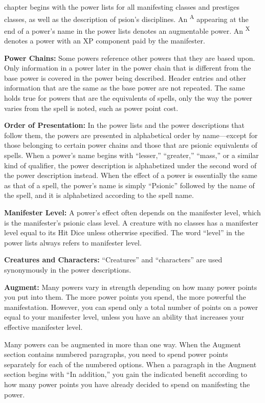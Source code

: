 {}{}

 chapter begins with the power lists for all manifesting classes and prestiges classes, as well as the description of psion's disciplines. An \textsuperscript{A} appearing at the end of a power's name in the power lists denotes an augmentable power. An \textsuperscript{X} denotes a power with an XP component paid by the manifester.

\textbf{Power Chains:} Some powers reference other powers that they are based upon. Only information in a power later in the power chain that is different from the base power is covered in the power being described. Header entries and other information that are the same as the base power are not repeated. The same holds true for powers that are the equivalents of spells, only the way the power varies from the spell is noted, such as power point cost.

\textbf{Order of Presentation:} In the power lists and the power descriptions that follow them, the powers are presented in alphabetical order by name---except for those belonging to certain power chains and those that are psionic equivalents of spells. When a power's name begins with ``lesser,'' ``greater,'' ``mass,'' or a similar kind of qualifier, the power description is alphabetized under the second word of the power description instead. When the effect of a power is essentially the same as that of a spell, the power's name is simply ``Psionic'' followed by the name of the spell, and it is alphabetized according to the spell name.

\textbf{Manifester Level:} A power's effect often depends on the manifester level, which is the manifester's psionic class level. A creature with no classes has a manifester level equal to its Hit Dice unless otherwise specified. The word ``level'' in the power lists always refers to manifester level.

\textbf{Creatures and Characters:} ``Creatures'' and ``characters'' are used synonymously in the power descriptions.

\textbf{Augment:} Many powers vary in strength depending on how many power points you put into them. The more power points you spend, the more powerful the manifestation. However, you can spend only a total number of points on a power equal to your manifester level, unless you have an ability that increases your effective manifester level.

Many powers can be augmented in more than one way. When the Augment section contains numbered paragraphs, you need to spend power points separately for each of the numbered options. When a paragraph in the Augment section begins with ``In addition,'' you gain the indicated benefit according to how many power points you have already decided to spend on manifesting the power.





